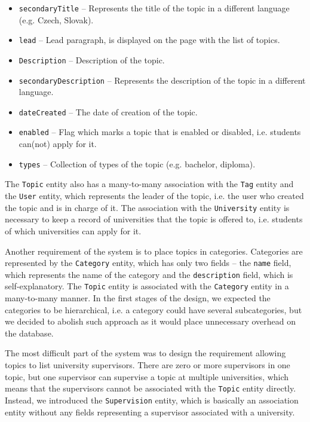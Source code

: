 \begin{itemize}
    \item \texttt{secondaryTitle} -- Represents the title of the topic in a different language (e.g. Czech, Slovak).
    \item \texttt{lead} -- Lead paragraph, is displayed on the page with the list of topics.
    \item \texttt{Description} -- Description of the topic.
    \item \texttt{secondaryDescription} -- Represents the description of the topic in a different language.
    \item \texttt{dateCreated} -- The date of creation of the topic.
    \item \texttt{enabled} -- Flag which marks a topic that is enabled or disabled, i.e. students can(not) apply for it.
    \item \texttt{types} -- Collection of types of the topic (e.g. bachelor, diploma).
\end{itemize}

The \texttt{Topic} entity also has a many-to-many association with the \texttt{Tag} entity and the \texttt{User} entity, which represents the leader of the topic, i.e. the user who created the topic and is in charge of it. The association with the \texttt{University} entity is necessary to keep a record of universities that the topic is offered to, i.e. students of which universities can apply for it.

Another requirement of the system is to place topics in categories. Categories are represented by the \texttt{Category} entity, which has only two fields -- the \texttt{name} field, which represents the name of the category and the \texttt{description} field, which is self-explanatory. The \texttt{Topic} entity is associated with the \texttt{Category} entity in a many-to-many manner. In the first stages of the design, we expected the categories to be hierarchical, i.e. a category could have several subcategories, but we decided to abolish such approach as it would place unnecessary overhead on the database.

The most difficult part of the system was to design the requirement allowing topics to list university supervisors. There are zero or more supervisors in one topic, but one supervisor can supervise a topic at multiple universities, which means that the supervisors cannot be associated with the \texttt{Topic} entity directly. Instead, we introduced the \texttt{Supervision} entity, which is basically an association entity without any fields representing a supervisor associated with a university.

